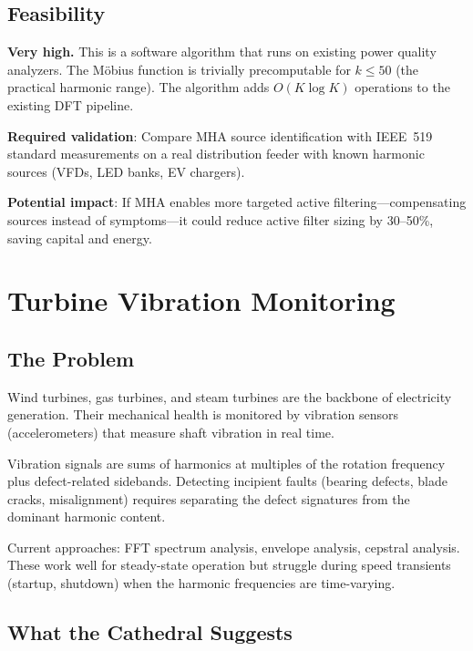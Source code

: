 \documentclass[11pt,a4paper]{article}
\begin{document}
\subsection{Feasibility}

\textbf{Very high.} This is a software algorithm that runs on
existing power quality analyzers. The M\"obius function is trivially
precomputable for $k \leq 50$ (the practical harmonic range). The
algorithm adds $O(K \log K)$ operations to the existing DFT pipeline.

\textbf{Required validation}: Compare MHA source identification with
IEEE~519 standard measurements on a real distribution feeder with
known harmonic sources (VFDs, LED banks, EV chargers).

\textbf{Potential impact}: If MHA enables more targeted active
filtering---compensating sources instead of symptoms---it could
reduce active filter sizing by 30--50\%, saving capital and energy.

\section{Turbine Vibration Monitoring}
\label{sec:turbines}

\subsection{The Problem}

Wind turbines, gas turbines, and steam turbines are the backbone of
electricity generation. Their mechanical health is monitored by
vibration sensors (accelerometers) that measure shaft vibration in
real time.

Vibration signals are sums of harmonics at multiples of the rotation
frequency plus defect-related sidebands. Detecting incipient faults
(bearing defects, blade cracks, misalignment) requires separating
the defect signatures from the dominant harmonic content.

Current approaches: FFT spectrum analysis, envelope analysis,
cepstral analysis. These work well for steady-state operation but
struggle during speed transients (startup, shutdown) when the
harmonic frequencies are time-varying.

\subsection{What the Cathedral Suggests}
\end{document}

